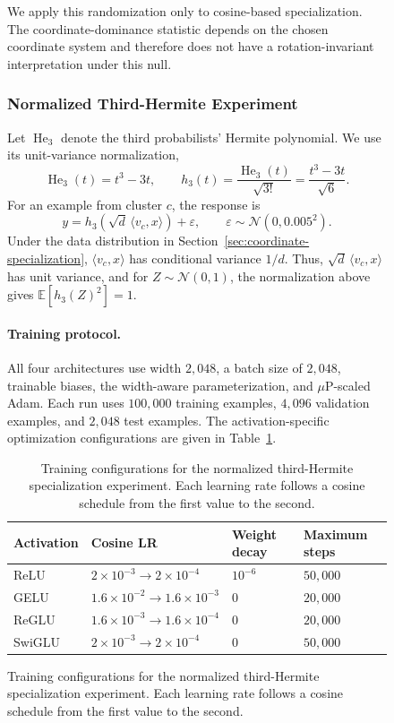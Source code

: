 \documentclass{article}
\begin{document}
\begin{figure}
We apply this randomization only to cosine-based specialization. The
coordinate-dominance statistic depends on the chosen coordinate system and
therefore does not have a rotation-invariant interpretation under this null.

\clearpage

\subsubsection{Normalized Third-Hermite Experiment}
\label{app:hermite3-specialization-experiment}

Let \(\operatorname{He}_3\) denote the third probabilists' Hermite
polynomial. We use its unit-variance normalization,
\[
    \operatorname{He}_3(t)=t^3-3t,
    \qquad
    h_3(t)
    =
    \frac{\operatorname{He}_3(t)}{\sqrt{3!}}
    =
    \frac{t^3-3t}{\sqrt6}.
\]
For an example from cluster \(c\), the response is
\[
    y
    =
    h_3\!\left(\sqrt d\,\langle v_c,x\rangle\right)
    +\varepsilon,
    \qquad
    \varepsilon\sim\mathcal N(0,0.005^2).
\]
Under the data distribution in Section~\ref{sec:coordinate-specialization},
\(\langle v_c,x\rangle\) has conditional variance \(1/d\). Thus,
\(\sqrt d\,\langle v_c,x\rangle\) has unit variance, and for
\(Z\sim\mathcal N(0,1)\), the normalization above gives
\(\mathbb E[h_3(Z)^2]=1\).

\paragraph{Training protocol.}
All four architectures use width \(2{,}048\), a batch size of \(2{,}048\),
trainable biases, the width-aware parameterization, and
\(\mu\mathrm{P}\)-scaled Adam. Each run uses \(100{,}000\) training examples,
\(4{,}096\) validation examples, and \(2{,}048\) test examples. The
activation-specific optimization configurations are given in
Table~\ref{tab:hermite3-training-protocol}.

\begin{table}[H]
    \centering
    \small
    \caption{Training configurations for the normalized third-Hermite
    specialization experiment. Each learning rate follows a cosine schedule
    from the first value to the second.}
    \label{tab:hermite3-training-protocol}
    \begin{tabularx}{\textwidth}{@{}lXXX@{}}
        \toprule
        Activation & Cosine LR & Weight decay & Maximum steps \\
        \midrule
        ReLU   & \(2\times10^{-3}\to2\times10^{-4}\)     & \(10^{-6}\) & \(50{,}000\) \\
        GELU   & \(1.6\times10^{-2}\to1.6\times10^{-3}\) & \(0\)       & \(20{,}000\) \\
        ReGLU  & \(1.6\times10^{-3}\to1.6\times10^{-4}\) & \(0\)       & \(20{,}000\) \\
        SwiGLU & \(2\times10^{-3}\to2\times10^{-4}\)     & \(0\)       & \(50{,}000\) \\
        \bottomrule
    \end{tabularx}
\end{table}


\end{figure}
\end{document}

